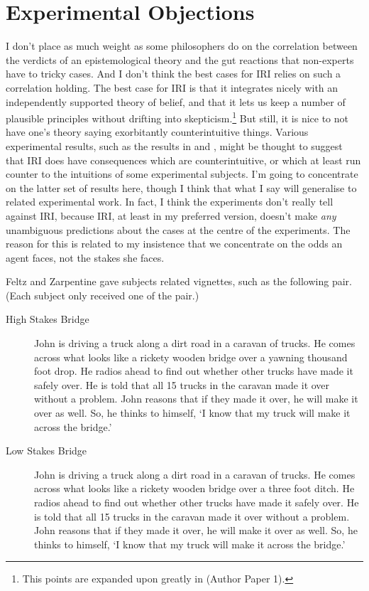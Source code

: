 \section{Experimental Objections} \label{sect:xphi}
I don't place as much weight as some philosophers do on the correlation between the verdicts of an epistemological theory and the gut reactions that non-experts have to tricky cases. And I don't think the best cases for IRI relies on such a correlation holding. The best case for IRI is that it integrates nicely with an independently supported theory of belief, and that it lets us keep a number of plausible principles without drifting into skepticism.\footnote{This points are expanded upon greatly in (Author Paper 1).} But still, it is nice to not have one's theory saying exorbitantly counterintuitive things. Various experimental results, such as the results in \citet{May2010} and \citet{FeltzZarpentine2010}, might be thought to suggest that IRI does have consequences which are counterintuitive, or which at least run counter to the intuitions of some experimental subjects. I'm going to concentrate on the latter set of results here, though I think that what I say will generalise to related experimental work. In fact, I think the experiments don't really tell against IRI, because IRI, at least in my preferred version, doesn't make \textit{any} unambiguous predictions about the cases at the centre of the experiments. The reason for this is related to my insistence that we concentrate on the odds an agent faces, not the stakes she faces.

Feltz and Zarpentine gave subjects related vignettes, such as the following pair. (Each subject only received one of the pair.)

\begin{description}
\item[High Stakes Bridge] John is driving a truck along a dirt road in a caravan of trucks. He comes across what looks like a rickety wooden bridge over a yawning thousand foot drop. He radios ahead to find out whether other trucks have made it safely over. He is told that all 15 trucks in the caravan made it over without a problem. John reasons that if they made it over, he will make it over as well. So, he thinks to himself, `I know that my truck will make it across the bridge.'

\item[Low Stakes Bridge] John is driving a truck along a dirt road in a caravan of trucks. He comes across what looks like a rickety wooden bridge over a three foot ditch. He radios ahead to find out whether other trucks have made it safely over. He is told that all 15 trucks in the caravan made it over without a problem. John reasons that if they made it over, he will make it over as well. So, he thinks to himself, `I know that my truck will make it across the bridge.' \citep[696]{FeltzZarpentine2010}
\end{description}

